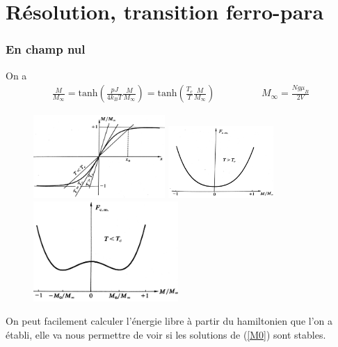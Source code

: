 \documentclass[12pt,prb,aps,epsf]{article}
\begin{document}
\section{Résolution, transition ferro-para}
\subsubsection{En champ nul}
On a 
\begin{eqnarray}
\frac{M}{M_{\infty}} = \mathrm{tanh}\left(\frac{pJ}{4k_BT}\frac{M}{M_{\infty}}\right) = \mathrm{tanh}\left(\frac{T_c}{T}\frac{M}{M_{\infty}}\right)
\hspace{2cm} M_{\infty} =\frac{Ng\mu_B}{2V} \label{M0}
\end{eqnarray}

\begin{figure}[h]
	\centerline{\includegraphics[width=5cm,angle=90]{Mx3}
		\includegraphics[width=4cm,angle=90]{F_T_sup_Tc}
		\includegraphics[width=5.5cm]{F_T_inf_Tc}}
\end{figure}

On peut facilement calculer l'énergie libre à partir du hamiltonien que l'on a établi, elle va nous permettre de voir si les solutions de (\ref{M0}) sont stables.
\end{document}
